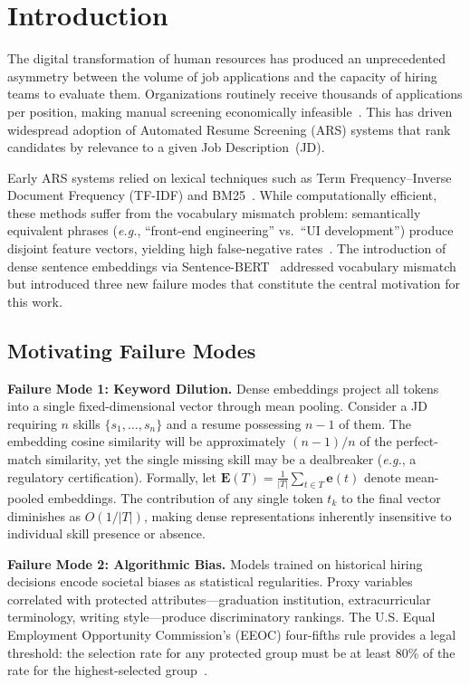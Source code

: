 \documentclass{svproc}
\begin{document}
\section{Introduction}

The digital transformation of human resources has produced an unprecedented asymmetry between the volume of job applications and the capacity of hiring teams to evaluate them. Organizations routinely receive thousands of applications per position, making manual screening economically infeasible~\cite{chen2023automated,kessler2018algorithm}. This has driven widespread adoption of Automated Resume Screening (ARS) systems that rank candidates by relevance to a given Job Description~(JD).

Early ARS systems relied on lexical techniques such as Term Frequency--Inverse Document Frequency (TF-IDF) and BM25~\cite{robertson2009probabilistic}. While computationally efficient, these methods suffer from the vocabulary mismatch problem: semantically equivalent phrases (\textit{e.g.}, ``front-end engineering'' vs.\ ``UI development'') produce disjoint feature vectors, yielding high false-negative rates~\cite{singh2020automated}. The introduction of dense sentence embeddings via Sentence-BERT~\cite{reimers2019sbert} addressed vocabulary mismatch but introduced three new failure modes that constitute the central motivation for this work.

\subsection{Motivating Failure Modes}

\textbf{Failure Mode 1: Keyword Dilution.} Dense embeddings project all tokens into a single fixed-dimensional vector through mean pooling. Consider a JD requiring $n$ skills $\{s_1, \ldots, s_n\}$ and a resume possessing $n{-}1$ of them. The embedding cosine similarity will be approximately $(n{-}1)/n$ of the perfect-match similarity, yet the single missing skill may be a dealbreaker (\textit{e.g.}, a regulatory certification). Formally, let $\mathbf{E}(T) = \frac{1}{|T|}\sum_{t \in T} \mathbf{e}(t)$ denote mean-pooled embeddings. The contribution of any single token $t_k$ to the final vector diminishes as $O(1/|T|)$, making dense representations inherently insensitive to individual skill presence or absence.

\textbf{Failure Mode 2: Algorithmic Bias.} Models trained on historical hiring decisions encode societal biases as statistical regularities. Proxy variables correlated with protected attributes---graduation institution, extracurricular terminology, writing style---produce discriminatory rankings. The U.S. Equal Employment Opportunity Commission's (EEOC) four-fifths rule provides a legal threshold: the selection rate for any protected group must be at least 80\% of the rate for the highest-selected group~\cite{dwork2012fairness,buolamwini2018gender}.
\end{document}
